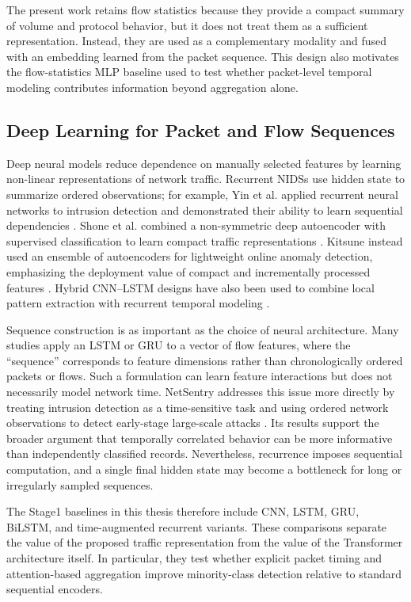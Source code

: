 The present work retains flow statistics because they provide a compact summary
of volume and protocol behavior, but it does not treat them as a sufficient
representation. Instead, they are used as a complementary modality and fused
with an embedding learned from the packet sequence. This design also motivates
the flow-statistics MLP baseline used to test whether packet-level temporal
modeling contributes information beyond aggregation alone.

\subsection{Deep Learning for Packet and Flow Sequences}
\label{subsec:rw_deep_sequences}

Deep neural models reduce dependence on manually selected features by learning
non-linear representations of network traffic. Recurrent NIDSs use hidden state
to summarize ordered observations; for example, Yin et al. applied recurrent
neural networks to intrusion detection and demonstrated their ability to learn
sequential dependencies \cite{Yin2017RNNIDS}. Shone et al. combined a
non-symmetric deep autoencoder with supervised classification to learn compact
traffic representations \cite{Shone2018NNAE}. Kitsune instead used an ensemble
of autoencoders for lightweight online anomaly detection, emphasizing the
deployment value of compact and incrementally processed features
\cite{Mirsky2018Kitsune}. Hybrid CNN--LSTM designs have also been used to combine
local pattern extraction with recurrent temporal modeling
\cite{Ullah2024IDSINT}.

Sequence construction is as important as the choice of neural architecture.
Many studies apply an LSTM or GRU to a vector of flow features, where the
``sequence'' corresponds to feature dimensions rather than chronologically
ordered packets or flows. Such a formulation can learn feature interactions but
does not necessarily model network time. NetSentry addresses this issue more
directly by treating intrusion detection as a time-sensitive task and using
ordered network observations to detect early-stage large-scale attacks
\cite{LiuPatras2022NetSentry}. Its results support the broader argument that
temporally correlated behavior can be more informative than independently
classified records. Nevertheless, recurrence imposes sequential computation,
and a single final hidden state may become a bottleneck for long or irregularly
sampled sequences.

The Stage1 baselines in this thesis therefore include CNN, LSTM, GRU, BiLSTM,
and time-augmented recurrent variants. These comparisons separate the value of
the proposed traffic representation from the value of the Transformer
architecture itself. In particular, they test whether explicit packet timing
and attention-based aggregation improve minority-class detection relative to
standard sequential encoders.


